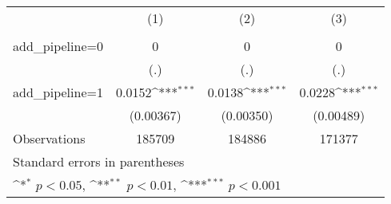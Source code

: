 {
\def\sym#1{\ifmmode^{#1}\else\(^{#1}\)\fi}
\begin{tabular}{l*{3}{c}}
\toprule
                    &\multicolumn{1}{c}{(1)}&\multicolumn{1}{c}{(2)}&\multicolumn{1}{c}{(3)}\\
                    &\multicolumn{1}{c}{} &\multicolumn{1}{c}{} &\multicolumn{1}{c}{} \\
\midrule
add\_pipeline=0      &           0         &           0         &           0         \\
                    &         (.)         &         (.)         &         (.)         \\
\addlinespace
add\_pipeline=1      &      0.0152\sym{***}&      0.0138\sym{***}&      0.0228\sym{***}\\
                    &   (0.00367)         &   (0.00350)         &   (0.00489)         \\
\midrule
Observations        &      185709         &      184886         &      171377         \\
\bottomrule
\multicolumn{4}{l}{\footnotesize Standard errors in parentheses}\\
\multicolumn{4}{l}{\footnotesize \sym{*} \(p<0.05\), \sym{**} \(p<0.01\), \sym{***} \(p<0.001\)}\\
\end{tabular}
}
